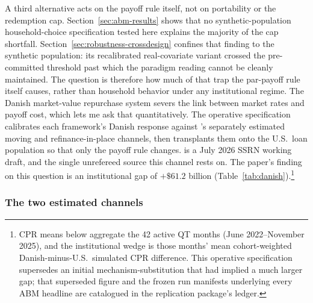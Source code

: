 \documentclass[12pt]{article}
\begin{document}
A third alternative acts on the payoff rule itself, not on portability or the redemption cap. Section~\ref{sec:abm-results} shows that no synthetic-population household-choice specification tested here explains the majority of the cap shortfall. Section~\ref{sec:robustness-crossdesign} confines that finding to the synthetic population: its recalibrated real-covariate variant crossed the pre-committed threshold past which the paradigm reading cannot be cleanly maintained. The question is therefore how much of that trap the par-payoff rule itself causes, rather than household behavior under any institutional regime. The Danish market-value repurchase system severs the link between market rates and payoff cost, which lets me ask that quantitatively. The operative specification calibrates each framework's Danish response against \citet{berger2026}'s separately estimated moving and refinance-in-place channels, then transplants them onto the U.S.\ loan population so that only the payoff rule changes. \citet{berger2026} is a July 2026 SSRN working draft, and the single unrefereed source this channel rests on. The paper's finding on this question is an institutional gap of $+\$61.2$ billion (Table~\ref{tab:danish}).\footnote{\label{fn:manifest}CPR means below aggregate the 42 active QT months (June 2022--November 2025), and the institutional wedge is those months' mean cohort-weighted Danish-minus-U.S.\ simulated CPR difference. This operative specification supersedes an initial mechanism-substitution that had implied a much larger gap; that superseded figure and the frozen run manifests underlying every ABM headline are catalogued in the replication package's ledger.}

\subsubsection{The two estimated channels}
\end{document}
